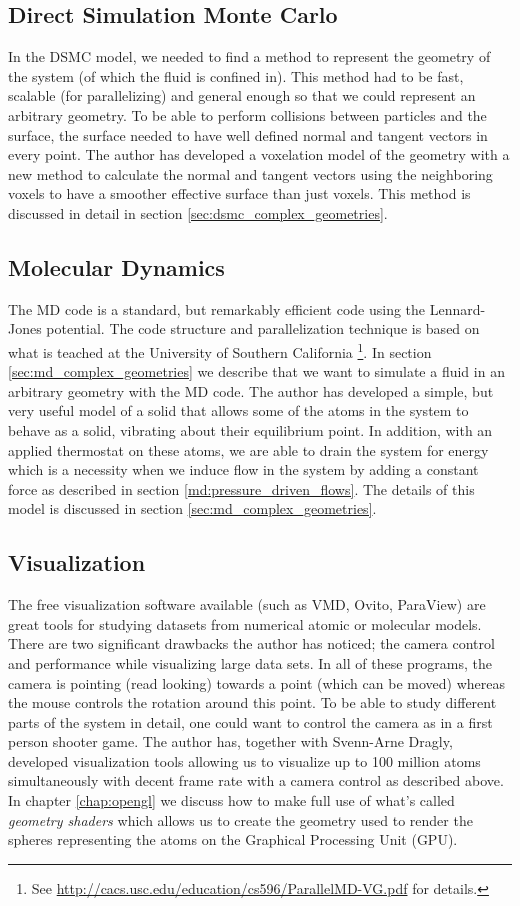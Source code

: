 \subsection{Direct Simulation Monte Carlo}
In the DSMC model, we needed to find a method to represent the geometry of the system (of which the fluid is confined in). This method had to be fast, scalable (for parallelizing) and general enough so that we could represent an arbitrary geometry. To be able to perform collisions between particles and the surface, the surface needed to have well defined normal and tangent vectors in every point. The author has developed a voxelation model of the geometry with a new method to calculate the normal and tangent vectors using the neighboring voxels to have a smoother effective surface than just voxels. This method is discussed in detail in section \ref{sec:dsmc_complex_geometries}.
\subsection{Molecular Dynamics}
The MD code is a standard, but remarkably efficient code using the Lennard-Jones potential. The code structure and parallelization technique is based on what is teached at the University of Southern California \footnote{See \url{http://cacs.usc.edu/education/cs596/ParallelMD-VG.pdf} for details.}. In section \ref{sec:md_complex_geometries} we describe that we want to simulate a fluid in an arbitrary geometry with the MD code. The author has developed a simple, but very useful model of a solid that allows some of the atoms in the system to behave as a solid, vibrating about their equilibrium point. In addition, with an applied thermostat on these atoms, we are able to drain the system for energy which is a necessity when we induce flow in the system by adding a constant force as described in section \ref{md:pressure_driven_flows}. The details of this model is discussed in section \ref{sec:md_complex_geometries}.
\subsection{Visualization}
The free visualization software available (such as VMD, Ovito, ParaView) are great tools for studying datasets from numerical atomic or molecular models. There are two significant drawbacks the author has noticed; the camera control and performance while visualizing large data sets. In all of these programs, the camera is pointing (read looking) towards a point (which can be moved) whereas the mouse controls the rotation around this point. To be able to study different parts of the system in detail, one could want to control the camera as in a first person shooter game. The author has, together with Svenn-Arne Dragly, developed visualization tools allowing us to visualize up to 100 million atoms simultaneously with decent frame rate with a camera control as described above. In chapter \ref{chap:opengl} we discuss how to make full use of what's called \textit{geometry shaders} which allows us to create the geometry used to render the spheres representing the atoms on the Graphical Processing Unit (GPU).